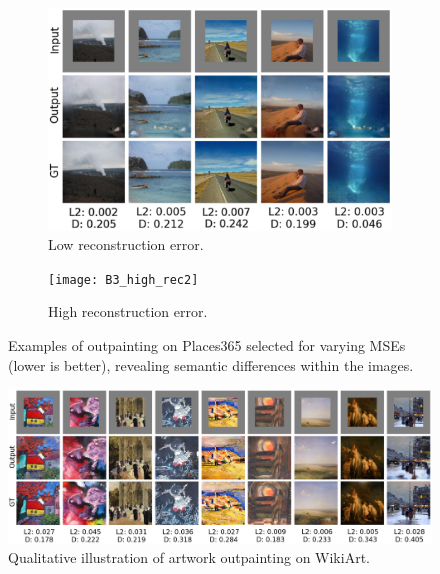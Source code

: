 \documentclass[twocolumn,showpacs,%
  nofootinbib,aps,superscriptaddress,%
  eqsecnum,prd,notitlepage,showkeys,10pt]{revtex4-1}
\begin{document}
\begin{figure}[tp]
  \centering
  \begin{subfigure}[t]{0.5\textwidth}
      \centering
      \includegraphics[width=0.95\linewidth]{B3_low_rec3b}
      \caption{Low reconstruction error.}
      \vspace{0.2cm}
  \end{subfigure}%
  \begin{subfigure}[t]{0.5\textwidth}
      \centering
      \texttt{[image: B3\_high\_rec2]}
      \caption{High reconstruction error.}
  \end{subfigure}
  \caption{Examples of outpainting on Places365 selected for varying MSEs (lower is better), revealing semantic differences within the images.}
  \label{fig:low_high_mse}
\end{figure}

\begin{figure}[tp]
\centering
  \begin{adjustbox}{center}
  \includegraphics[width=\textwidth]{B4_samples_test}
  \end{adjustbox}
  \caption{Qualitative illustration of artwork outpainting on WikiArt.}
  \label{fig:B4_samples}
\end{figure}
\end{document}
